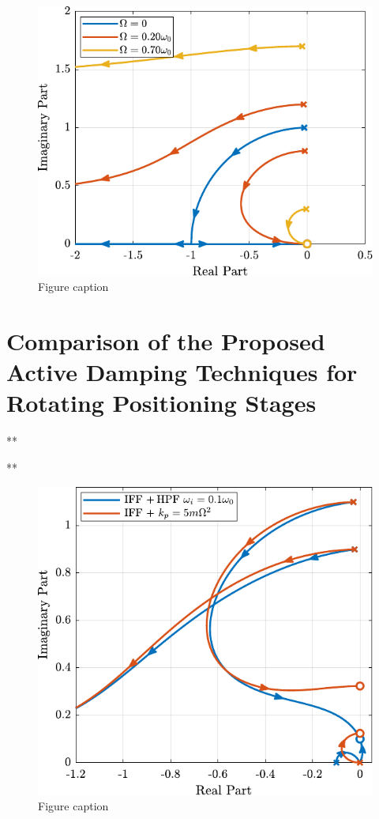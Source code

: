 \documentclass{ISMA_USD2020}
\begin{document}
\begin{figure}[htbp]
\centering
\includegraphics[scale=1]{figs/root_locus_dvf.pdf}
\caption{\label{fig:root_locus_dvf}Figure caption}
\end{figure}

\section{Comparison of the Proposed Active Damping Techniques for Rotating Positioning Stages}
\label{sec:orgade0126}
**

**

\begin{figure}[htbp]
\centering
\includegraphics[scale=1]{figs/comp_root_locus.pdf}
\caption{\label{fig:comp_root_locus}Figure caption}
\end{figure}
\end{document}
